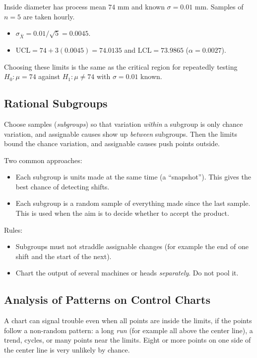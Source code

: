 \begin{example}
Inside diameter has process mean $74$ mm and known $\sigma=0.01$ mm. Samples of $n=5$ are taken hourly.
\begin{itemize}
  \item $\sigma_{\bar{X}}=0.01/\sqrt5=0.0045$.
  \item $\mathrm{UCL}=74+3(0.0045)=74.0135$ and $\mathrm{LCL}=73.9865$ ($\alpha=0.0027$).
\end{itemize}
Choosing these limits is the same as the critical region for repeatedly testing $H_0:\mu=74$ against $H_1:\mu\ne74$ with $\sigma=0.01$ known.
\end{example}

\subsection{Rational Subgroups}

Choose samples (\emph{subgroups}) so that variation \emph{within} a subgroup is only chance variation, and assignable causes show up \emph{between} subgroups. Then the limits bound the chance variation, and assignable causes push points outside.

Two common approaches:
\begin{itemize}
  \item Each subgroup is units made at the same time (a ``snapshot''). This gives the best chance of detecting shifts.
  \item Each subgroup is a random sample of everything made since the last sample. This is used when the aim is to decide whether to accept the product.
\end{itemize}
Rules:
\begin{itemize}
  \item Subgroups must not straddle assignable changes (for example the end of one shift and the start of the next).
  \item Chart the output of several machines or heads \emph{separately}. Do not pool it.
\end{itemize}

\subsection{Analysis of Patterns on Control Charts}

A chart can signal trouble even when all points are inside the limits, if the points follow a non-random pattern: a long \emph{run} (for example all above the center line), a trend, cycles, or many points near the limits. Eight or more points on one side of the center line is very unlikely by chance.

